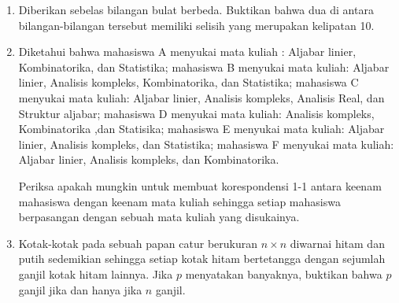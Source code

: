 \documentclass[12pt,twoside]{article}
\begin{document}
\begin{enumerate}
	\item Diberikan sebelas bilangan bulat berbeda. Buktikan bahwa dua di antara bilangan-bilangan tersebut memiliki selisih yang merupakan kelipatan 10.

	\item Diketahui bahwa mahasiswa A menyukai mata kuliah : Aljabar linier, Kombinatorika, dan Statistika; mahasiswa B menyukai mata kuliah: Aljabar linier, Analisis kompleks, Kombinatorika, dan Statistika; mahasiswa C menyukai mata kuliah: Aljabar linier, Analisis kompleks, Analisis Real, dan Struktur aljabar; mahasiswa D menyukai mata kuliah: Analisis kompleks, Kombinatorika ,dan Statisika; mahasiswa E menyukai mata kuliah: Aljabar linier, Analisis kompleks, dan Statistika; mahasiswa F menyukai mata kuliah: Aljabar linier, Analisis kompleks, dan Kombinatorika.

	      Periksa apakah mungkin untuk membuat korespondensi 1-1 antara keenam mahasiswa dengan keenam mata kuliah sehingga setiap mahasiswa berpasangan dengan sebuah mata kuliah yang disukainya.

	\item Kotak-kotak pada sebuah papan catur berukuran $n\times n$ diwarnai hitam dan putih sedemikian sehingga setiap kotak hitam bertetangga dengan sejumlah ganjil kotak hitam lainnya. Jika $p$ menyatakan banyaknya, buktikan bahwa $p$ ganjil jika dan hanya jika $n$ ganjil.
\end{enumerate}
\newpage
\newpage
\end{document}
